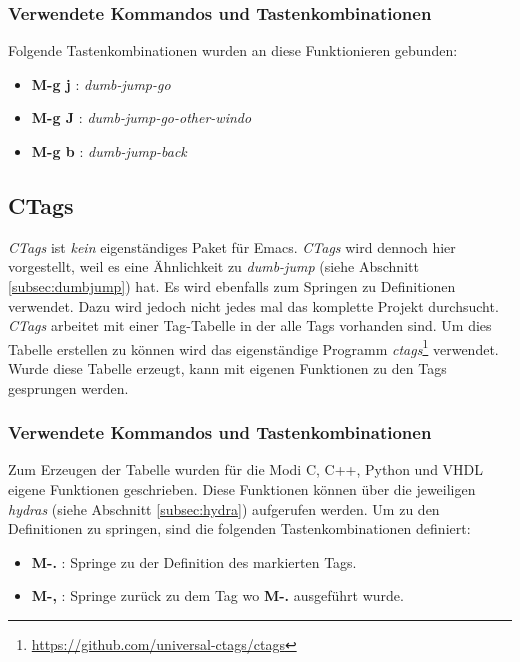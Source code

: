 \subsubsection{Verwendete Kommandos und Tastenkombinationen}
Folgende Tastenkombinationen wurden an diese Funktionieren gebunden:
\begin{itemize}
\item \textbf{M-g j} : \textit{dumb-jump-go}
\item \textbf{M-g J} : \textit{dumb-jump-go-other-windo}
\item \textbf{M-g b} : \textit{dumb-jump-back}
\end{itemize}

\subsection{CTags}
\label{subsec:ctags}
\textit{CTags} ist \textit{kein} eigenständiges Paket für
Emacs. \textit{CTags} wird dennoch hier vorgestellt, weil es eine
Ähnlichkeit zu \textit{dumb-jump} (siehe Abschnitt
\ref{subsec:dumbjump}) hat. Es wird ebenfalls zum Springen zu
Definitionen verwendet. Dazu wird jedoch nicht jedes mal das komplette
Projekt durchsucht. \textit{CTags} arbeitet mit einer Tag-Tabelle in
der alle Tags vorhanden sind. Um dies Tabelle erstellen zu können wird
das eigenständige Programm
\textit{ctags}\footnote{\url{https://github.com/universal-ctags/ctags}}
verwendet. Wurde diese Tabelle erzeugt, kann mit eigenen Funktionen zu
den Tags gesprungen werden. \cite{CTags}\\

\subsubsection{Verwendete Kommandos und Tastenkombinationen}
Zum Erzeugen der Tabelle wurden für die Modi C, C++, Python und VHDL
eigene Funktionen geschrieben. Diese Funktionen können über die
jeweiligen \textit{hydras} (siehe Abschnitt \ref{subsec:hydra})
aufgerufen werden. Um zu den Definitionen zu springen, sind die
folgenden Tastenkombinationen definiert:
\begin{itemize}
\item \textbf{M-.} : Springe zu der Definition des markierten Tags.
\item \textbf{M-,} : Springe zurück zu dem Tag wo \textbf{M-.}
  ausgeführt wurde.\\
\end{itemize}


